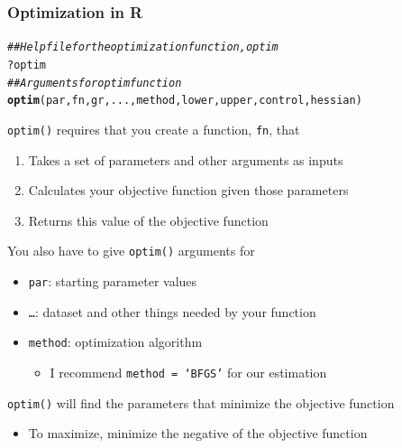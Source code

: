 \documentclass{beamer}\usepackage[]{graphicx}\usepackage[]{xcolor}
\makeatletter
\newcommand{\hlcom}[1]{\textcolor[rgb]{0.678,0.584,0.686}{\textit{#1}}}%
\newcommand{\hlopt}[1]{\textcolor[rgb]{0,0,0}{#1}}%
\newcommand{\hlstd}[1]{\textcolor[rgb]{0.345,0.345,0.345}{#1}}%
\newcommand{\hlkwd}[1]{\textcolor[rgb]{0.737,0.353,0.396}{\textbf{#1}}}%
\newenvironment{kframe}{%
 \def\at@end@of@kframe{}%
 \ifinner\ifhmode%
  \def\at@end@of@kframe{\end{minipage}}%
  \begin{minipage}{\columnwidth}%
 \fi\fi%
 \def\FrameCommand##1{\hskip\@totalleftmargin \hskip-\fboxsep
 \colorbox{shadecolor}{##1}\hskip-\fboxsep
     \hskip-\linewidth \hskip-\@totalleftmargin \hskip\columnwidth}%
 \MakeFramed {\advance\hsize-\width
   \@totalleftmargin\z@ \linewidth\hsize
   \@setminipage}}%
 {\par\unskip\endMakeFramed%
 \at@end@of@kframe}
\newenvironment{knitrout}{}{} %
\makeatother
\begin{document}
\begin{frame}[fragile]\frametitle{Optimization in R}
\begin{knitrout}\footnotesize
{}\color{fgcolor}\begin{kframe}
\begin{alltt}
\hlcom{## Help file for the optimization function, optim}
\hlopt{?}\hlstd{optim}
\hlcom{## Arguments for optim function}
\hlkwd{optim}\hlstd{(par, fn, gr, ..., method, lower, upper, control, hessian)}
\end{alltt}
\end{kframe}
\end{knitrout}
    \vspace{1ex}
    \texttt{optim()} requires that you create a function, \texttt{fn}, that
    \begin{enumerate}
        \item Takes a set of parameters and other arguments as inputs
        \item Calculates your objective function given those parameters
        \item Returns this value of the objective function
    \end{enumerate}
    \vspace{1ex}
    You also have to give \texttt{optim()} arguments for
    \begin{itemize}
        \item \texttt{par}: starting parameter values
        \item \texttt{\ldots}: dataset and other things needed by your function
        \item \texttt{method}: optimization algorithm
        \begin{itemize}
            \item I recommend \texttt{method = `BFGS'} for our estimation
        \end{itemize}
    \end{itemize}
    \vspace{1ex}
    \texttt{optim()} will find the parameters that minimize the objective function
    \begin{itemize}
        \item To maximize, minimize the negative of the objective function
    \end{itemize}
\end{frame}
\end{document}
